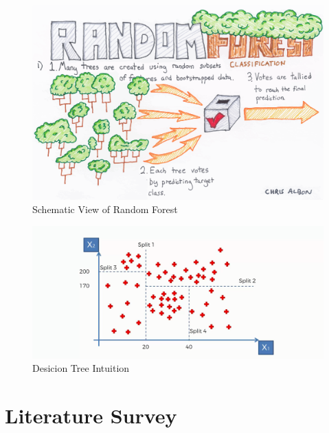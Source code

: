 \documentclass{beamer}
\begin{document}
\begin{frame}
    \begin{figure}
        \includegraphics[scale=0.15]{img/Random_Forest.png}
        \caption*{Schematic View of Random Forest}
    \end{figure}
    \end{frame}
\begin{frame}
    \begin{figure}
        \includegraphics[scale=0.35]{img/decision_tree_intuition.png}
        \caption*{Desicion Tree Intuition}
    \end{figure}
    \end{frame}
\section{Literature Survey}
\end{document}
